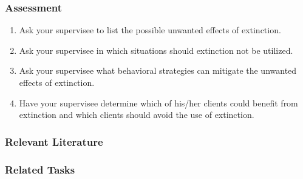 \subsection{Assessment}
\begin{enumerate}
\item Ask your supervisee to list the possible unwanted effects of extinction.
\item Ask your supervisee in which situations should extinction not be utilized.
\item Ask your supervisee what behavioral strategies can mitigate the unwanted effects of extinction.
\item Have your supervisee determine which of his/her clients could benefit from extinction and which clients should avoid the use of extinction. 
%
\end{enumerate}
%
\subsection{Relevant Literature}
\begin{refsection}
\nocite{test,alang2017police,clayton2018black}
\printbibliography[heading=none]
\end{refsection}
%
\subsection{Related Tasks}
\fourdTwo{}\\
\fourdEighteen{}\\
\fourdNineteen{}\\
\foureOne{}\\
\foureEight{}\\
%
%
%
%
\chapter{\foursecd{}}
